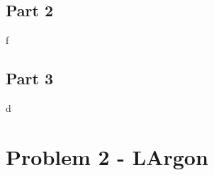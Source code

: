 \documentclass[singlepage,notitlepage,nofootinbib,11pt]{revtex4-1}
\begin{document}
\subsection{Part 2}
f
\subsection{Part 3}
d

\section{Problem 2 - LArgon}
\end{document}
